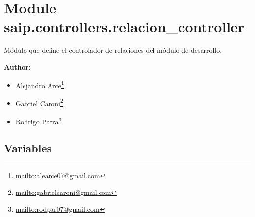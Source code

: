 %
%
%


\section{Module saip.controllers.relacion\_controller}

    \label{saip:controllers:relacion_controller}
Módulo que define el controlador de relaciones del módulo de desarrollo.

\textbf{Author:} \begin{itemize}
\setlength{\parskip}{0.6ex}
  \item Alejandro 
    Arce\footnote{\href{mailto:alearce07@gmail.com}{mailto:alearce07@gmail.com}}

  \item Gabriel 
    Caroni\footnote{\href{mailto:gabrielcaroni@gmail.com}{mailto:gabrielcaroni@gmail.com}}

  \item Rodrigo 
    Parra\footnote{\href{mailto:rodpar07@gmail.com}{mailto:rodpar07@gmail.com}}

\end{itemize}





  \subsection{Variables}

